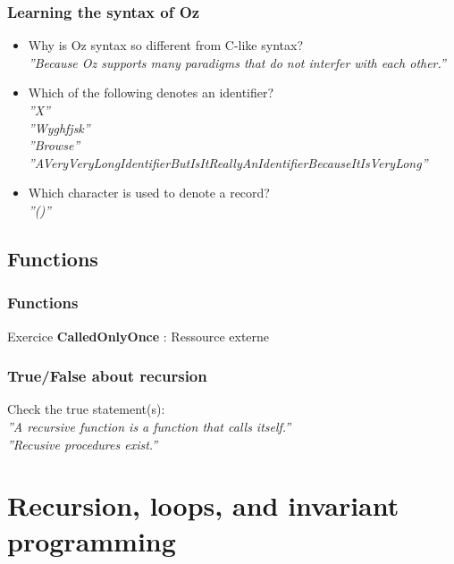 \documentclass[fr,license=none]{../../../eplsummary}
\begin{document}
			\subsubsection*{Learning the syntax of Oz}
				\begin{itemize}
					\item Why is Oz syntax so different from C-like syntax?\\
						\textit{''Because Oz supports many paradigms that do not interfer with each other.''}
					\item Which of the following denotes an identifier?\\
						\textit{''X''}\\
						\textit{''Wyghfjsk''}\\
						\textit{''Browse''}\\
						\textit{''AVeryVeryLongIdentifierButIsItReallyAnIdentifierBecauseItIsVeryLong''}
					\item Which character is used to denote a record?\\
						\textit{''()''}
				\end{itemize}
				
		\subsection{Functions}
			\subsubsection*{Functions}
				Exercice \textbf{CalledOnlyOnce} : Ressource externe\\
				
			\subsubsection*{True/False about recursion}
				Check the true statement(s):\\
				\textit{''A recursive function is a function that calls itself.''}\\
				\textit{''Recusive procedures exist.''}
				
	\section{Recursion, loops, and invariant programming}
\end{document}
